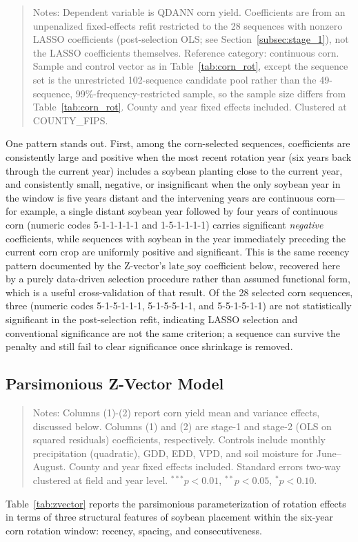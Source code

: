 \documentclass[12pt,letterpaper]{article}
\theoremstyle{remark}
\theoremstyle{remark}
\theoremstyle{plain}
\theoremstyle{definition}
\begin{document}

\begin{quote}
\small
Notes: Dependent variable is QDANN corn yield. Coefficients are from an unpenalized fixed-effects refit restricted to the 28 sequences with nonzero LASSO coefficients (post-selection OLS; see Section~\ref{subsec:stage_1}), not the LASSO coefficients themselves. Reference category: continuous corn. Sample and control vector as in Table~\ref{tab:corn_rot}, except the sequence set is the unrestricted 102-sequence candidate pool rather than the 49-sequence, 99\%-frequency-restricted sample, so the sample size differs from Table~\ref{tab:corn_rot}. County and year fixed effects included. Clustered at COUNTY\_FIPS. %
\end{quote}

One pattern stands out. First, among the corn-selected sequences, coefficients are consistently large and positive when the most recent rotation year (six years back through the current year) includes a soybean planting close to the current year, and consistently small, negative, or insignificant when the only soybean year in the window is five years distant and the intervening years are continuous corn---for example, a single distant soybean year followed by four years of continuous corn (numeric codes 5-1-1-1-1-1 and 1-5-1-1-1-1) carries significant \emph{negative} coefficients, while sequences with soybean in the year immediately preceding the current corn crop are uniformly positive and significant. This is the same recency pattern documented by the Z-vector's $\text{late\_soy}$ coefficient below, recovered here by a purely data-driven selection procedure rather than assumed functional form, which is a useful cross-validation of that result. Of the 28 selected corn sequences, three (numeric codes 5-1-5-1-1-1, 5-1-5-5-1-1, and 5-5-1-5-1-1) are not statistically significant in the post-selection refit, indicating LASSO selection and conventional significance are not the same criterion; a sequence can survive the penalty and still fail to clear significance once shrinkage is removed.

\subsection{Parsimonious Z-Vector Model}


\begin{quote}
\small
Notes: Columns (1)-(2) report corn yield mean and variance effects, discussed below. Columns (1) and (2) are stage-1 and stage-2 (OLS on squared residuals) coefficients, respectively. Controls include monthly precipitation (quadratic), GDD, EDD, VPD, and soil moisture for June--August. County and year fixed effects included. Standard errors two-way clustered at field and year level. $^{***}p<0.01$, $^{**}p<0.05$, $^{*}p<0.10$.
\end{quote}
Table~\ref{tab:zvector} reports the parsimonious parameterization of rotation effects in terms of three structural features of soybean placement within the six-year corn rotation window: recency, spacing, and consecutiveness.
\end{document}

